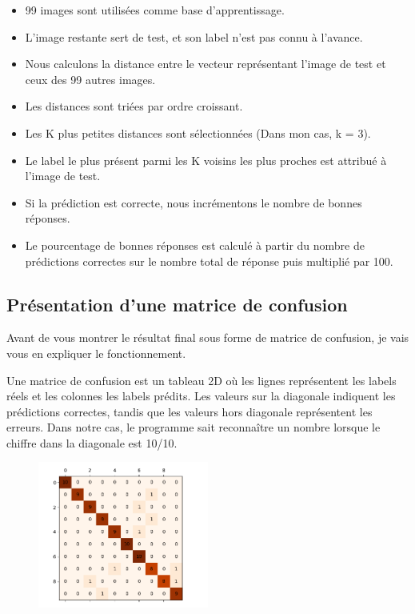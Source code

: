\documentclass{article}
\begin{document}
\begin{itemize}
    \item 99 images sont utilisées comme base d'apprentissage.
    \item L'image restante sert de test, et son label n'est pas connu à l'avance.
    \item Nous calculons la distance entre le vecteur représentant l'image de test et ceux des 99 autres images.
    \item Les distances sont triées par ordre croissant.
    \item Les K plus petites distances sont sélectionnées (Dans mon cas, k = 3).
    \item Le label le plus présent parmi les K voisins les plus proches est attribué à l'image de test.
    \item Si la prédiction est correcte, nous incrémentons le nombre de bonnes réponses.
    \item Le pourcentage de bonnes réponses est calculé à partir du nombre de prédictions correctes sur le nombre total de réponse puis multiplié par 100.
\end{itemize}

\subsection{Présentation d’une matrice de confusion}
Avant de vous montrer le résultat final sous forme de matrice de confusion, je vais vous en expliquer le fonctionnement.

Une matrice de confusion est un tableau 2D où les lignes représentent les labels réels et les colonnes les labels prédits. Les valeurs sur la diagonale indiquent les prédictions correctes, tandis que les valeurs hors diagonale représentent les erreurs. Dans notre cas, le programme sait reconnaître un nombre lorsque le chiffre dans la diagonale est 10/10. 

\begin{figure}[h]
    \centering
    \includegraphics[width=0.5\textwidth]{images/matrice_confusion.png}
\end{figure}
\end{document}
